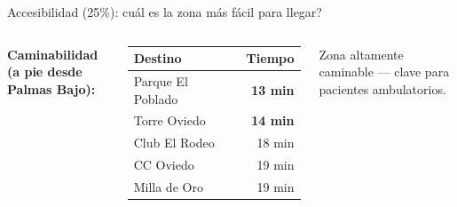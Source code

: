 \documentclass[aspectratio=169, 11pt]{beamer}
\begin{document}
\begin{frame}{\textcolor{acc}{Accesibilidad (25\%)}: \textquestiondown cu\'{a}l es la zona m\'{a}s f\'{a}cil para llegar?}
\begin{columns}[T]
\vspace{4pt}
{\scriptsize\textbf{Caminabilidad (a pie desde Palmas Bajo):}}
\vspace{2pt}

{\scriptsize
\begin{tabular}{@{}lr@{}}
\toprule
\textbf{Destino} & \textbf{Tiempo} \\
\midrule
\rowcolor{acc!8}
Parque El Poblado & \textcolor{acc}{\textbf{13 min}} \\
Torre Oviedo & \textcolor{acc}{\textbf{14 min}} \\
Club El Rodeo & 18 min \\
CC Oviedo & 19 min \\
Milla de Oro & 19 min \\
\bottomrule
\end{tabular}
}

\vspace{2pt}
{\tiny\color{slate} Zona altamente caminable --- clave para pacientes ambulatorios.}
\end{columns}
\end{frame}
\end{document}
